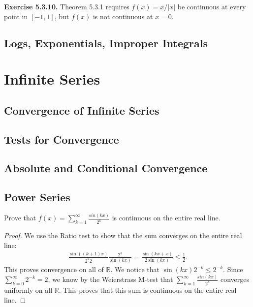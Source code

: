 \documentclass[12pt]{book}
\newcommand{\R}{\mathbb{R}}
\newenvironment{exercise}[2][Exercise]{\begin{trivlist}
\item[\hskip \labelsep {\bfseries #1}\hskip \labelsep {\bfseries #2.}]}{\end{trivlist}}
\newcommand{\prb}[1]{\textbf{Exercise #1.}}
\begin{document}
\prb{5.3.10} Theorem 5.3.1 requires $f(x) = x/|x|$ be continuous at every point in $[-1, 1]$, but $f(x)$ is not continuous at $x = 0.$


\section{Logs, Exponentials, Improper Integrals}


\chapter{Infinite Series}

\section{Convergence of Infinite Series}


\section{Tests for Convergence}


\section{Absolute and Conditional Convergence}


\section{Power Series}


\begin{exercise}{6.4.2}
Prove that $f(x) = \sum_{k=1}^\infty \frac{sin (kx)}{2^k} $ is continuous on the entire real line.

\begin{proof}
    We use the Ratio test to show that the sum converges on the entire real line:
        \begin{align*}
        \frac{\sin\left( (k+1)x \right)}{2^k 2} \frac{2^k}{\sin(kx)} = \frac{\sin \left(kx+x\right)}{2 \sin(kx)} \leq \frac{1}{2}.
        \end{align*}
    This proves convergence on all of $\R$. We notice that $\sin(kx)2^{-k} \leq 2^{-k}$. Since $\sum_{k=0}^\infty 2^{-k} = 2$, we know by the Weierstrass M-test that $\sum_{k=1}^\infty \frac{sin (kx)}{2^k}$ converges uniformly on all $\R$. This proves that this sum is continuous on the entire real line.
\end{proof}
\end{exercise}
\end{document}
